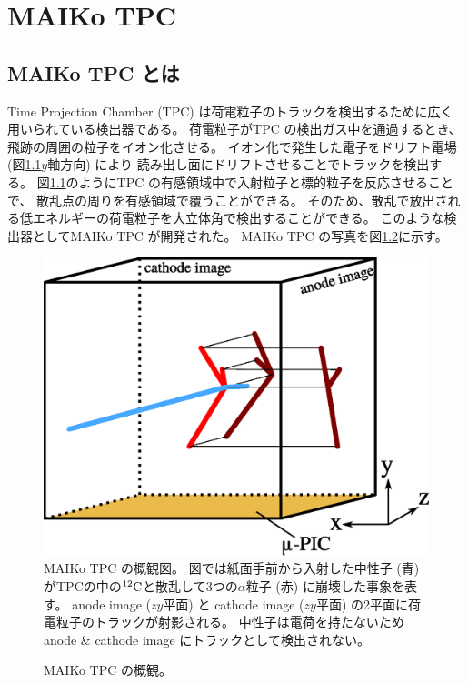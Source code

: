 \chapter{MAIKo TPC}
\section{MAIKo TPC とは}
Time Projection Chamber (TPC) は荷電粒子のトラックを検出するために広く用いられている検出器である。
荷電粒子がTPC の検出ガス中を通過するとき、飛跡の周囲の粒子をイオン化させる。
イオン化で発生した電子をドリフト電場 (図\ref{fig::MAIKo_view}$y$軸方向) により
読み出し面にドリフトさせることでトラックを検出する。
図\ref{fig::MAIKo_view}のようにTPC の有感領域中で入射粒子と標的粒子を反応させることで、
散乱点の周りを有感領域で覆うことができる。
そのため、散乱で放出される低エネルギーの荷電粒子を大立体角で検出することができる。
このような検出器としてMAIKo TPC が開発された。
MAIKo TPC の写真を図\ref{pic::MAIKo}に示す。
\begin{figure}
  \centering
  \includegraphics[clip, width=0.7\columnwidth]{eps/MAIKo2.eps}
  \caption[MAIKo TPC の概観図。]{MAIKo TPC の概観図。
    図では紙面手前から入射した中性子 (青) がTPCの中の${}^{12}{\rm C}$と散乱して3つの$\alpha$粒子 (赤) に崩壊した事象を表す。
    anode image ($zy$平面) と cathode image ($zy$平面) の2平面に荷電粒子のトラックが射影される。
    中性子は電荷を持たないためanode \& cathode image にトラックとして検出されない。
  }
  \label{fig::MAIKo_view}
\end{figure}
\begin{figure}
  \centering
  \caption[MAIKo TPC の概観。]{MAIKo TPC の概観。}
  \label{pic::MAIKo}
\end{figure}

